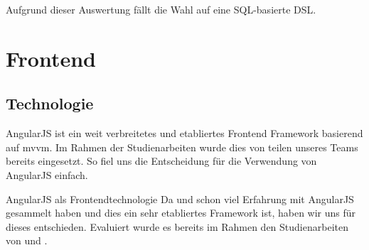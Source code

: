 Aufgrund dieser Auswertung fällt die Wahl auf eine SQL-basierte DSL.

\section{Frontend}
\subsection{Technologie}
AngularJS ist ein weit verbreitetes und etabliertes Frontend Framework basierend auf \acs{mvvm}. Im Rahmen der Studienarbeiten wurde dies von teilen unseres Teams bereits eingesetzt. So fiel uns die Entscheidung für die Verwendung von AngularJS einfach.
\begin{decision}[label=dec:frontend:technology]{AngularJS als Frontendtechnologie}
Da \chuf und \fscf schon viel Erfahrung mit AngularJS gesammelt haben und dies ein sehr etabliertes Framework ist, haben wir uns für dieses entschieden. Evaluiert wurde es bereits im Rahmen den Studienarbeiten von \fscf und \rlif.
\end{decision}

